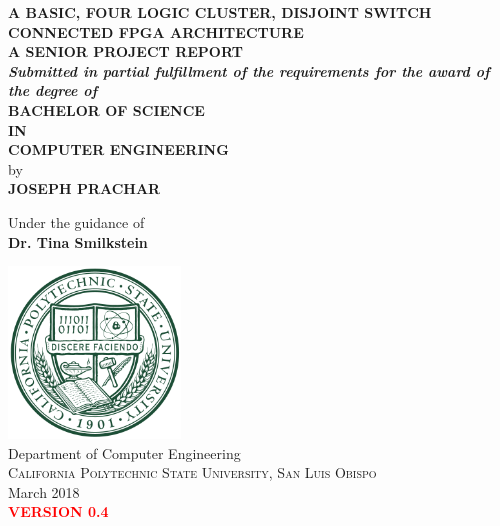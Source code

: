 \documentclass[12pt]{article}
\renewcommand{\baselinestretch}{1.5}
\begin{document}
\begin{titlepage}

\begin{center}

\renewcommand{\baselinestretch}{1.5}
\Large \textbf { A BASIC, FOUR LOGIC CLUSTER, DISJOINT SWITCH CONNECTED FPGA ARCHITECTURE }\\[0.8in]

\normalsize
\textbf{ A SENIOR PROJECT REPORT}\\[0.1in]
 \small
       \textit{\textbf{Submitted in partial fulfillment of
        the requirements for the award of the degree of}}\\[0.3in]
\normalsize
       \textbf{ BACHELOR OF SCIENCE \\IN\\ COMPUTER ENGINEERING}\\[0.5in]

 by \\
\textbf{ JOSEPH PRACHAR }

\vspace{.3in}
Under the guidance of\\
{\textbf{ Dr. Tina Smilkstein }}\\[0.1in]

\vfill

\includegraphics[height=1.8in]{logo}\\[0.1in]
{Department of Computer Engineering}\\
\normalsize
\textsc{ California Polytechnic State University, San Luis Obispo }\\
March 2018\\
\textcolor{red}{\textbf{VERSION 0.4}}


\end{center}

\end{titlepage}
\end{document}

